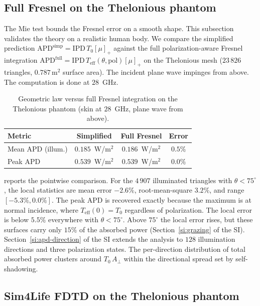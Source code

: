 \documentclass[journal,twocolumn,10pt]{IEEEtran}
\newcommand{\IPD}{\mathrm{IPD}}
\newcommand{\APD}{\mathrm{APD}}
\newcommand{\Aperp}{A_\perp}
\newcommand{\Teff}{T_{\mathrm{eff}}}
\newcommand{\pospart}[1]{\left[#1\right]_{+}}
\begin{document}
\subsection{Full Fresnel on the Thelonious phantom}\label{subsec:val-fresnel}

The Mie test bounds the Fresnel error on a smooth shape. This
subsection validates the theory on a realistic human body. We compare the simplified
prediction $\APD^{\mathrm{simp}} = \IPD\,T_0 \pospart{\mu}$ against
the full polarization-aware Fresnel integration $\APD^{\mathrm{full}}
= \IPD\,\Teff(\theta, \mathrm{pol}) \pospart{\mu}$ on the Thelonious
mesh ($23\,826$ triangles, $0.787\,\mathrm{m}^2$ surface area). The
incident plane wave impinges from above. The computation is done at
$28$~GHz.

\begin{table}[!t]
\centering
\caption{Geometric law versus full Fresnel integration on the
Thelonious phantom (skin at $28$~GHz, plane wave from above).}
\label{tab:phantom}
\begin{tabular}{lccc}
\toprule
Metric & Simplified & Full Fresnel & Error \\
\midrule
Mean $\APD$ (illum.)     & $0.185$~W/m$^2$ & $0.186$~W/m$^2$ & $0.5\%$ \\
Peak $\APD$              & $0.539$~W/m$^2$ & $0.539$~W/m$^2$ & $0.0\%$ \\
\bottomrule
\end{tabular}
\end{table}

 reports the pointwise comparison. For the
$4\,907$ illuminated triangles with
$\theta < 75^\circ$, the local statistics are mean error $-2.6\%$,
root-mean-square $3.2\%$, and range $[-5.3\%, 0.0\%]$. The peak
$\APD$ is recovered exactly because the maximum is at normal incidence,
where $\Teff(0) = T_0$ regardless of polarization. The local error is
below $5.5\%$ everywhere with $\theta < 75^\circ$. Above $75^\circ$
the local error rises, but these surfaces carry only $15\%$ of the
absorbed power (Section~\ref{si:grazing} of the SI).
Section~\ref{si:apd-direction} of the SI extends the analysis to
$128$ illumination directions and three polarization states. The
per-direction distribution of total absorbed power clusters around
$T_0\,\Aperp$ within the directional spread set by self-shadowing.

\subsection{Sim4Life FDTD on the Thelonious phantom}\label{subsec:val-fdtd}
\end{document}
